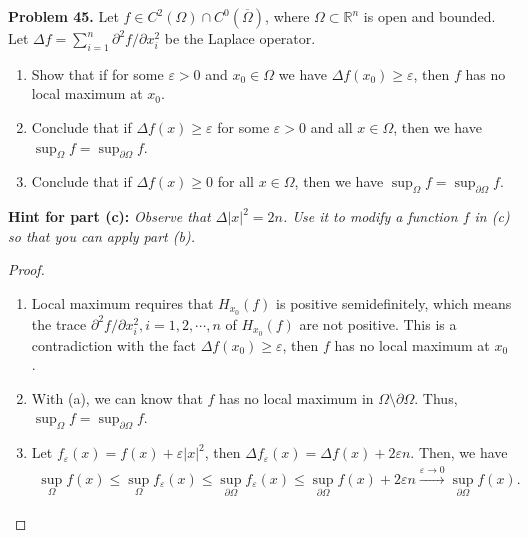 \documentclass[12pt,leqno]{amsart}
\theoremstyle{definition}
\begin{document}
\noindent
{\bf Problem 45.}
Let $f \in C^2(\Omega) \cap C^0(\overline{\Omega})$, where $\Omega \subset \mathbb{R}^n$ is open and bounded.
Let $\Delta f = \sum_{i=1}^n \partial^2f/\partial x_i^2$ be the Laplace operator.
\begin{enumerate}
    \item[(a)] Show that if for some $\varepsilon > 0$ and $x_0 \in \Omega$ we have $\Delta f(x_0) \geq \varepsilon$, then $f$ has no local maximum at $x_0$.
    
    \item[(b)] Conclude that if $\Delta f(x) \geq \varepsilon$ for some $\varepsilon > 0$ and all $x \in \Omega$, then we have $\sup_{\Omega} f = \sup_{\partial \Omega} f$.
    
    \item[(c)] Conclude that if $\Delta f(x) \geq 0$ for all $x \in \Omega$, then we have $\sup_{\Omega} f = \sup_{\partial \Omega} f$.
\end{enumerate}
{\bf Hint for part (c):} {\em Observe that $\Delta |x|^2 = 2n$. Use it to modify a function $f$ in (c) so that you can apply part (b).}
\begin{proof}
~\begin{enumerate}
    \item[(a)] Local maximum requires that $H_{x_0}(f)$ is positive semidefinitely, which means the trace $\partial^2f/\partial x_i^2, i = 1,2,\cdots,n$ of $H_{x_0}(f)$ are not positive. This is a contradiction with the fact $\Delta f(x_0) \geq \varepsilon$, then $f$ has no local maximum at $x_0$.
    
    \item[(b)] With (a), we can know that $f$ has no local maximum in $\Omega \setminus \partial \Omega$. Thus, $\sup_{\Omega} f = \sup_{\partial \Omega} f$.
    
    \item[(c)] Let $f_\varepsilon(x) = f(x) + \varepsilon |x|^2$, then $\Delta f_\varepsilon(x) = \Delta f(x) + 2 \varepsilon n$. Then, we have
    \begin{align*}
        \sup_{\Omega} f(x) \leq \sup_{\Omega} f_\varepsilon(x) \leq \sup_{\partial\Omega} f_\varepsilon(x) \leq \sup_{\partial \Omega} f(x) + 2 \varepsilon n \xrightarrow{\varepsilon \to 0} \sup_{\partial \Omega} f(x).
    \end{align*}
\end{enumerate}
\end{proof}

\medskip
\end{document}

